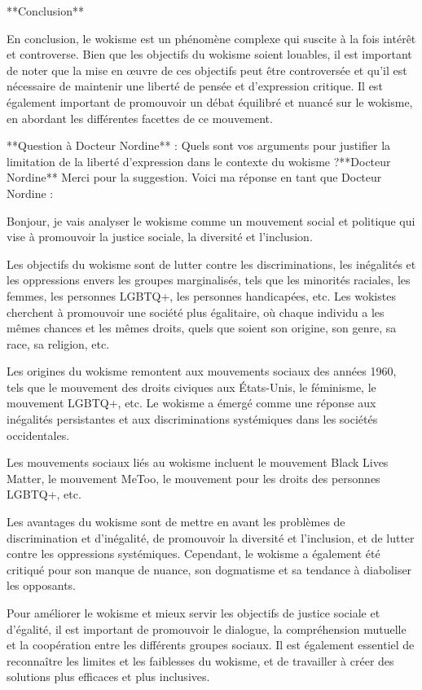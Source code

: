 **Conclusion**

En conclusion, le wokisme est un phénomène complexe qui suscite à la fois intérêt et controverse. Bien que les objectifs du wokisme soient louables, il est important de noter que la mise en œuvre de ces objectifs peut être controversée et qu'il est nécessaire de maintenir une liberté de pensée et d'expression critique. Il est également important de promouvoir un débat équilibré et nuancé sur le wokisme, en abordant les différentes facettes de ce mouvement.

**Question à Docteur Nordine** : Quels sont vos arguments pour justifier la limitation de la liberté d'expression dans le contexte du wokisme ?**Docteur Nordine**
Merci pour la suggestion. Voici ma réponse en tant que Docteur Nordine :

Bonjour, je vais analyser le wokisme comme un mouvement social et politique qui vise à promouvoir la justice sociale, la diversité et l'inclusion.

Les objectifs du wokisme sont de lutter contre les discriminations, les inégalités et les oppressions envers les groupes marginalisés, tels que les minorités raciales, les femmes, les personnes LGBTQ+, les personnes handicapées, etc. Les wokistes cherchent à promouvoir une société plus égalitaire, où chaque individu a les mêmes chances et les mêmes droits, quels que soient son origine, son genre, sa race, sa religion, etc.

Les origines du wokisme remontent aux mouvements sociaux des années 1960, tels que le mouvement des droits civiques aux États-Unis, le féminisme, le mouvement LGBTQ+, etc. Le wokisme a émergé comme une réponse aux inégalités persistantes et aux discriminations systémiques dans les sociétés occidentales.

Les mouvements sociaux liés au wokisme incluent le mouvement Black Lives Matter, le mouvement MeToo, le mouvement pour les droits des personnes LGBTQ+, etc.

Les avantages du wokisme sont de mettre en avant les problèmes de discrimination et d'inégalité, de promouvoir la diversité et l'inclusion, et de lutter contre les oppressions systémiques. Cependant, le wokisme a également été critiqué pour son manque de nuance, son dogmatisme et sa tendance à diaboliser les opposants.

Pour améliorer le wokisme et mieux servir les objectifs de justice sociale et d'égalité, il est important de promouvoir le dialogue, la compréhension mutuelle et la coopération entre les différents groupes sociaux. Il est également essentiel de reconnaître les limites et les faiblesses du wokisme, et de travailler à créer des solutions plus efficaces et plus inclusives.

